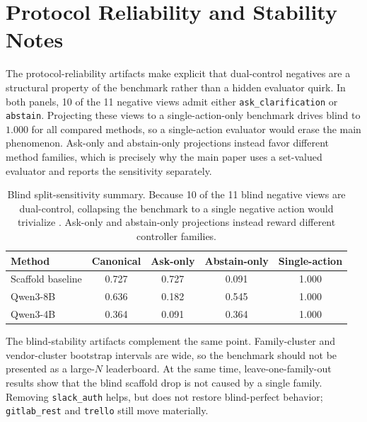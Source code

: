 \section{Protocol Reliability and Stability Notes}

The protocol-reliability artifacts make explicit that dual-control negatives are a structural property of the benchmark rather than a hidden evaluator quirk. In both panels, 10 of the 11 negative views admit either \texttt{ask\_clarification} or \texttt{abstain}. Projecting these views to a single-action-only benchmark drives blind \NOS{} to $1.000$ for all compared methods, so a single-action evaluator would erase the main phenomenon. Ask-only and abstain-only projections instead favor different method families, which is precisely why the main paper uses a set-valued evaluator and reports the sensitivity separately.

\begin{table}[h]
    \centering
    \small
    \begin{tabular}{lcccc}
        \toprule
        Method & Canonical \NOS{} & Ask-only \NOS{} & Abstain-only \NOS{} & Single-action \NOS{} \\
        \midrule
        Scaffold baseline & 0.727 & 0.727 & 0.091 & 1.000 \\
        Qwen3-8B & 0.636 & 0.182 & 0.545 & 1.000 \\
        Qwen3-4B & 0.364 & 0.091 & 0.364 & 1.000 \\
        \bottomrule
    \end{tabular}
    \caption{Blind split-sensitivity summary. Because 10 of the 11 blind negative views are dual-control, collapsing the benchmark to a single negative action would trivialize \NOS{}. Ask-only and abstain-only projections instead reward different controller families.}
    \label{tab:appendix-sensitivity}
\end{table}

The blind-stability artifacts complement the same point. Family-cluster and vendor-cluster bootstrap intervals are wide, so the benchmark should not be presented as a large-$N$ leaderboard. At the same time, leave-one-family-out results show that the blind scaffold drop is not caused by a single family. Removing \texttt{slack\_auth} helps, but does not restore blind-perfect behavior; \texttt{gitlab\_rest} and \texttt{trello} still move \NOS{} materially.

